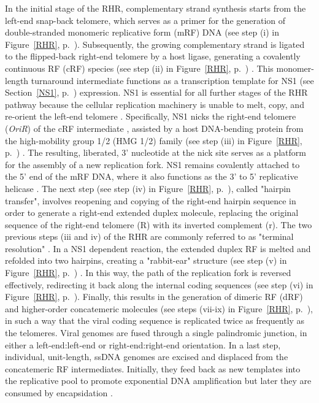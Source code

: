 In the initial stage of the RHR, complementary strand synthesis starts from the left-end snap-back telomere, which serves as a primer for the generation of double-stranded monomeric replicative form (mRF) DNA (see step (i) in Figure~\ref{RHR}, p.~\pageref{RHR}). Subsequently, the growing complementary strand is ligated to the flipped-back right-end telomere by a host ligase, generating a covalently continuous RF (cRF) species (see step (ii) in Figure~\ref{RHR}, p.~\pageref{RHR}) \cite{pmid2911112, pmid2543770}. This monomer-length turnaround intermediate functions as a transcription template for NS1 (see Section~\ref{NS1}, p.~\pageref{NS1}) expression. NS1 is essential for all further stages of the RHR pathway because the cellular replication machinery is unable to melt, copy, and re-orient the left-end telomere \cite{pmid8995615}. Specifically, NS1 nicks the right-end telomere (\textit{OriR}) of the cRF intermediate \cite{pmid9349487}, assisted by a host DNA-bending protein from the high-mobility group 1/2 (HMG 1/2) family (see step (iii) in Figure~\ref{RHR}, p.~\pageref{RHR}) \cite{pmid9765384}. The resulting, liberated, 3' nucleotide at the nick site serves as a platform for the assembly of a new replication fork. NS1 remains covalently attached to the 5' end of the mRF DNA, where it also functions as the 3' to 5' replicative helicase \cite{pmid12050365, pmid3339715, pmid3203742}. The next step (see step (iv) in Figure~\ref{RHR}, p.~\pageref{RHR}), called "hairpin transfer", involves reopening and copying of the right-end hairpin sequence in order to generate a right-end extended duplex molecule, replacing the original sequence of the right-end telomere (R) with its inverted complement (r). The two previous steps (iii and iv) of the RHR are commonly referred to as "terminal resolution" \cite{telomere2}. In a NS1 dependent reaction, the extended duplex RF is melted and refolded into two hairpins, creating a "rabbit-ear" structure (see step (v) in Figure~\ref{RHR}, p.~\pageref{RHR}) \cite{pmid14997524, pmid12075084}. In this way, the path of the replication fork is reversed effectively, redirecting it back along the internal coding sequences (see step (vi) in Figure~\ref{RHR}, p.~\pageref{RHR}). Finally, this results in the generation of dimeric RF (dRF) and higher-order concatemeric molecules (see steps (vii-ix) in Figure~\ref{RHR}, p.~\pageref{RHR}), in such a way that the viral coding sequence is replicated twice as frequently as the telomeres. Viral genomes are fused through a single palindromic junction, in either a left-end:left-end or right-end:right-end orientation. In a last step, individual, unit-length, ssDNA genomes are excised and displaced from the concatemeric RF intermediates. Initially, they feed back as new templates into the replicative pool to promote exponential DNA amplification but later they are consumed by encapsidation \cite{pmid15681430, encapsidation}.           


